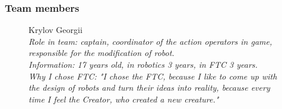 \fillpage

\subsubsection{Team members}
\begin{figure}[H]
	\begin{minipage}[h]{0.47\linewidth}
	\end{minipage}
	\hfill
	\begin{minipage}[h]{0.47\linewidth}
		Krylov Georgii \\
		\emph{Role in team: captain, coordinator of the action operators in game, responsible for the modification of robot.\\}
		\emph{Information: 17 years old, in robotics 3 years, in FTC 3 years. \\}
		\emph{Why I chose FTC: "I chose the FTC, because I like to come up with the design of robots and turn their ideas into reality, because every time I feel the Creator, who created a new creature."}		

\end{minipage}
\end{figure}
